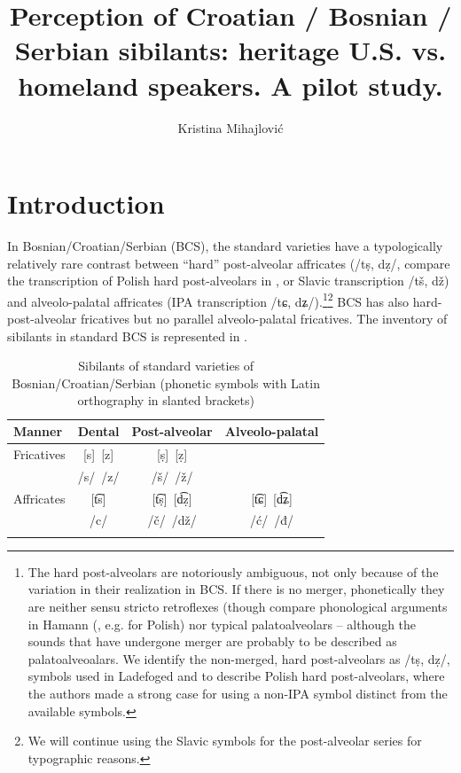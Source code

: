 \documentclass[output=paper,modfonts,nonflat,
]{langsci/langscibook}
\author{Kristina Mihajlović\affiliation{Department of Linguistics, University of Arizona}\lastand{Małgorzata Ćavar\affiliation{Department of Linguistics, Indiana University}}}
\title{Perception of Croatian / Bosnian / Serbian sibilants: heritage U.S. vs. homeland speakers. A pilot study.}
\begin{document}
\maketitle 
{}

 

\section{Introduction}

In Bosnian/Croatian/Serbian (BCS), the standard varieties have a typologically relatively rare contrast between “hard” post-alveolar affricates (/tṣ, dẓ/, compare the transcription of Polish  hard post-alveolars in \citet{LadefogedDisner2012}, or Slavic transcription /tš, dž) and alveolo-palatal affricates (IPA transcription /tɕ, dʑ/).\footnote{The hard post-alveolars are notoriously ambiguous, not only because of the variation in their realization in BCS. If there is no merger, phonetically they are neither sensu stricto retroflexes (though compare phonological arguments in Hamann (\citeyear*{Hamann2003}, e.g. for Polish) nor typical palatoalveolars – although the sounds that have undergone merger are probably to be described as palatoalveoalars. We identify the non-merged, hard post-alveolars as /tṣ, dẓ/, symbols used in Ladefoged and \citet[169]{Disner2012} to describe Polish hard post-alveolars, where the authors made a strong case for using a non-IPA symbol distinct from the available symbols.}\footnote{We will continue using the Slavic symbols for the post-alveolar series for typographic reasons.} BCS has also hard-post-alveolar fricatives but no parallel alveolo-palatal fricatives. The inventory of sibilants in standard BCS is represented in .


\begin{table}
\begin{tabularx}{\textwidth}{XCCC} 
\lsptoprule 
 Manner &   {     Dental} & { Post-alveolar} & {     Alveolo-palatal}\\
\midrule 
Fricatives & [s]~[z]& [ṣ]~[ẓ] \\
           & /s/~/z/& /š/~/ž/ \\
\tablevspace           
Affricates & [t͡s]   & [t͡ṣ]~[d͡ẓ] & [t͡ɕ]~[d͡ʑ]\\
           & /c/    & /č/~/dž/  & /ć/~/đ/\\
\lspbottomrule
\end{tabularx}
\caption{\label{tab:mihajlovic:1} Sibilants of standard varieties of Bosnian/Croatian/Serbian (phonetic symbols with Latin orthography in slanted brackets)}
\end{table}
\end{document}

